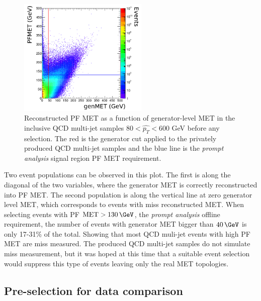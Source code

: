 \begin{figure}[!htb]
\centering
\includegraphics[width=0.55\textwidth]{Chapter05/ParkedDataPreparation/Images/Joao_140209_p11.png}
\caption{Reconstructed \gls{PF} \gls{MET} as a function of generator-level \gls{MET} in the inclusive \gls{QCD} multi-jet samples $80 < \hat{p_T} < 600$ GeV before any selection. The red is the generator cut applied to the privately produced \gls{QCD} multi-jet samples and the blue line is the \textit{prompt analysis} signal region \gls{PF} \gls{MET} requirement.}
\label{FIGURE:PreparationParkedDataAnalysis_QCDVBFMET_RecovsGenMET}
\end{figure}

Two event populations can be observed in this plot. The first is along the diagonal of the two variables, where the generator \gls{MET} is correctly reconstructed into \gls{PF} \gls{MET}. The second population is along the vertical line at zero generator level \gls{MET}, which corresponds to events with miss reconstructed \gls{MET}. When selecting events with \gls{PF} $\text{MET}>130\,\GeV$, the \textit{prompt analysis} offline requirement, the number of events with generator \gls{MET} bigger than $40\,\GeV$ is only 17-31\% of the total. Showing that most \gls{QCD} muli-jet events with high \gls{PF} \gls{MET} are miss measured. The produced \gls{QCD} multi-jet samples do not simulate miss measurement, but it was hoped at this time that a suitable event selection would suppress this type of events leaving only the real \gls{MET} topologies.

\subsection{Pre-selection for data comparison}
\label{SECTION:PreparationParkedDataAnalysis_QCDVBFMETPreselection}

